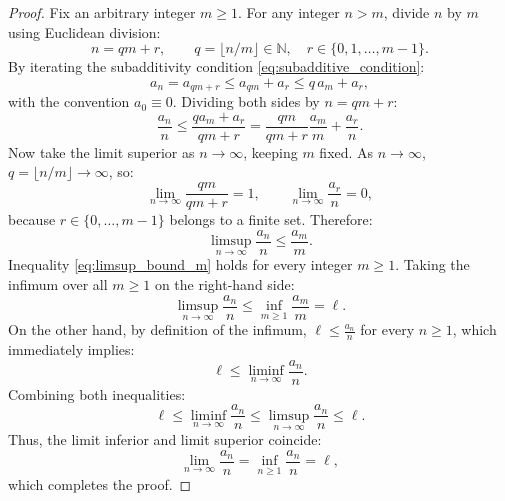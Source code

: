 \begin{proof}
Fix an arbitrary integer $m \ge 1$. For any integer $n > m$, divide $n$ by $m$ using Euclidean division:
\begin{equation}
n = q m + r, \qquad q = \lfloor n/m \rfloor \in \mathbb{N}, \quad r \in \{0, 1, \dots, m-1\}.
\end{equation}
By iterating the subadditivity condition \eqref{eq:subadditive_condition}:
\begin{equation}
a_n = a_{q m + r} \le a_{q m} + a_r \le q \, a_m + a_r,
\end{equation}
with the convention $a_0 \equiv 0$. Dividing both sides by $n = q m + r$:
\begin{equation}
\label{eq:fekete_division_bound}
\frac{a_n}{n} \le \frac{q a_m + a_r}{q m + r} = \frac{q m}{q m + r} \frac{a_m}{m} + \frac{a_r}{n}.
\end{equation}
Now take the limit superior as $n \to \infty$, keeping $m$ fixed. As $n \to \infty$, $q = \lfloor n/m \rfloor \to \infty$, so:
\begin{equation}
\lim_{n \to \infty} \frac{q m}{q m + r} = 1, \qquad \lim_{n \to \infty} \frac{a_r}{n} = 0,
\end{equation}
because $r \in \{0, \dots, m-1\}$ belongs to a finite set. Therefore:
\begin{equation}
\label{eq:limsup_bound_m}
\limsup_{n \to \infty} \frac{a_n}{n} \le \frac{a_m}{m}.
\end{equation}
Inequality \eqref{eq:limsup_bound_m} holds for every integer $m \ge 1$. Taking the infimum over all $m \ge 1$ on the right-hand side:
\begin{equation}
\limsup_{n \to \infty} \frac{a_n}{n} \le \inf_{m \ge 1} \frac{a_m}{m} = \ell.
\end{equation}
On the other hand, by definition of the infimum, $\ell \le \frac{a_n}{n}$ for every $n \ge 1$, which immediately implies:
\begin{equation}
\ell \le \liminf_{n \to \infty} \frac{a_n}{n}.
\end{equation}
Combining both inequalities:
\begin{equation}
\ell \le \liminf_{n \to \infty} \frac{a_n}{n} \le \limsup_{n \to \infty} \frac{a_n}{n} \le \ell.
\end{equation}
Thus, the limit inferior and limit superior coincide:
\begin{equation}
\lim_{n \to \infty} \frac{a_n}{n} = \inf_{n \ge 1} \frac{a_n}{n} = \ell,
\end{equation}
which completes the proof.
\end{proof}


